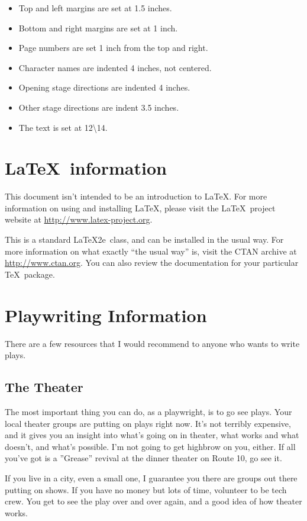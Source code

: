 \documentclass{report}
\begin{document}
\begin{itemize}
\item Top and left margins are set at 1.5 inches.
\item Bottom and right margins are set at 1 inch.
\item Page numbers are set 1 inch from the top and right.
\item Character names are indented 4 inches, not centered.
\item Opening stage directions are indented 4 inches.
\item Other stage directions are indent 3.5 inches.
\item The text is set at 12\textbackslash 14.
\end{itemize}

\section{\LaTeX\ information}

This document isn’t intended to be an introduction to \LaTeX. For more information on using and installing \LaTeX, please visit the \LaTeX\ project website at \url{http://www.latex-project.org}.

This is a standard \LaTeX2e\ class, and can be installed in the usual way. For more information on what exactly “the usual way” is, visit the CTAN archive at \url{http://www.ctan.org}. You can also review the documentation for your particular \TeX\ package.

\section{Playwriting Information}

There are a few resources that I would recommend to anyone who wants to write plays.

\subsection{The Theater}

The most important thing you can do, as a playwright, is to go see plays. Your local theater groups are putting on plays right now. It’s not terribly expensive, and it gives you an insight into what’s going on in theater, what works and what doesn’t, and what’s possible. I’m not going to get highbrow on you, either. If all you’ve got is a ”Grease” revival at the dinner theater on Route 10, go see it.

If you live in a city, even a small one, I guarantee you there are groups out there putting on shows. If you have no money but lots of time, volunteer to be tech crew. You get to see the play over and over again, and a good idea of how theater works.
\end{document}
